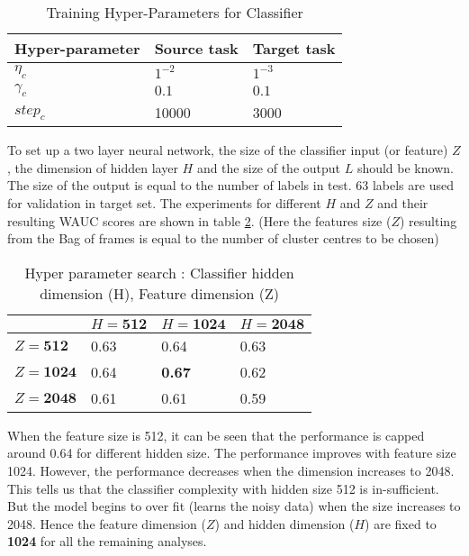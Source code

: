 \begin{table}[!htb]
\centering
\begin{tabular}{| p{} | p{} | p{} |}
\hline
\textbf{Hyper-parameter} & \textbf{Source task} & \textbf{Target task}\\
\hline
${\eta}_{c}$ & $1^{-2}$ & $1^{-3}$ \\ 
\hline
${\gamma}_{c}$ & $0.1$ & $ 0.1$\\
\hline
${step}_{c}$ & 10000 & 3000 \\
\hline
\end{tabular}
\caption{Training Hyper-Parameters for Classifier}\label{tab:a2} 
\end{table}
\FloatBarrier

\noindent To set up a two layer neural network, the size of the classifier input (or feature) $Z$, the dimension of hidden layer $H$ and the size of the output $L$ should be known. The size of the output is equal to the number of labels in test. 63 labels are used for validation in target set. The experiments for different $H$ and $Z$ and their resulting WAUC scores are shown in table \ref{tab:a3}. (Here the features size ($Z$) resulting from the Bag of frames is equal to the number of cluster centres to be chosen)
 
\begin{table}[!htb]
\centering
\begin{tabular}{| p{} | p{}| p{}| p{} |}
\hline
& $H = \textbf{512}$ & $H = \textbf{1024}$ & $H = \textbf{2048}$\\
\hline
$Z = \textbf{512}$  & 0.63 & 0.64 & 0.63\\
\hline
$Z = \textbf{1024}$ & 0.64 & \textbf{0.67 }& 0.62\\ 
\hline
$Z = \textbf{2048}$ & 0.61 & 0.61 & 0.59\\
\hline
\end{tabular}
\caption{Hyper parameter search : Classifier hidden dimension (H), Feature dimension (Z)}\label{tab:a3} 
\end{table}
\FloatBarrier

\noindent When the feature size is 512, it can be seen that the performance is capped around 0.64 for different hidden size. The performance improves with feature size 1024. However, the performance decreases when the dimension increases to 2048. This tells us that the classifier complexity with hidden size 512 is in-sufficient. But the model begins to over fit (learns the noisy data) when the size increases to 2048. Hence the feature dimension ($Z$) and hidden dimension ($H$) are fixed to \textbf{1024} for all the remaining analyses. 

